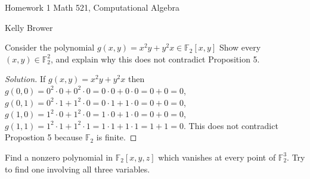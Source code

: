 \documentclass{article}
\newenvironment{problem}[2][Problem]{\begin{trivlist}
\item[\hskip \labelsep {\bfseries #1}\hskip \labelsep {\bfseries #2.}]}{\end{trivlist}}
\newenvironment{solution}{\begin{proof}[Solution]}{\end{proof}}
\begin{document}
\large %
\linespread{1} %


{\Large Homework 1 %
\hfill  Math 521, Computational Algebra}

\begin{center}
{\Large Kelly Brower} %
\end{center}
\vspace{0.05in}

%

\begin{problem}{(2a)}
Consider the polynomial $g(x,y) = x^2y + y^2x \in \mathbb{F}_2[x,y]$ Show every $(x,y) \in \mathbb{F}^2_2$, and explain why this does not contradict Proposition 5.
\end{problem}

\begin{solution}
If $g(x,y) = x^2y + y^2x$ then \newline  $g(0,0) = 0^2\cdot0 + 0^2\cdot0 = 0\cdot0 + 0\cdot0 = 0 + 0= 0$,\newline  $g(0,1) = 0^2\cdot1 + 1^2\cdot0 = 0\cdot1 + 1\cdot0 = 0 + 0= 0$, \newline  $g(1,0) = 1^2\cdot0 + 1^2\cdot0 = 1\cdot0 + 1\cdot0 = 0 + 0= 0$, \newline  $g(1,1) = 1^2\cdot1 + 1^2\cdot1 = 1\cdot1 + 1\cdot1 = 1 + 1= 0$. \newline This does not contradict Propostion 5  because $\mathbb{F}_2$ is finite.
\end{solution}

\begin{problem}{(2b)}
Find a nonzero polynomial in $\mathbb{F}_2[x,y,z]$ which vanishes at every point of $\mathbb{F}^3_2$. Try to find one involving all three variables.
\end{problem}
\end{document}
